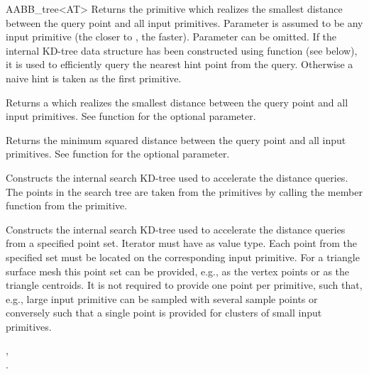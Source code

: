 \begin{ccRefClass}{AABB_tree<AT>}
{Returns the primitive which realizes the smallest distance between the query point and all input primitives. Parameter  is assumed to be any input primitive (the closer  to , the faster). Parameter  can be omitted. If the internal KD-tree data structure has been constructed using function  (see below), it is used to efficiently query the nearest hint point from the query. Otherwise a naive hint is taken as the first primitive. }

{Returns a  which realizes the smallest distance between the query point and all input primitives. See  function for the optional  parameter. }

{Returns the minimum squared distance between the query point and all input primitives. See  function for the optional  parameter. }



{ Constructs the internal search KD-tree used to accelerate the distance queries. The points in the search tree are taken from the primitives by calling the member function  from the primitive.}

\begin{ccAdvanced}
{ Constructs the internal search KD-tree used to accelerate the distance queries from a specified point set. Iterator  must have  as value type. Each point from the specified  set must be located on the corresponding input primitive. For a triangle surface mesh this point set can be provided, e.g., as the vertex points or as the triangle centroids. It is not required to provide one point per primitive, such that, e.g., large input primitive can be sampled with several sample points or conversely such that a single point is provided for clusters of small input primitives. }
\end{ccAdvanced}

\ccSeeAlso

, \\
.

\end{ccRefClass}

\ccRefPageEnd

